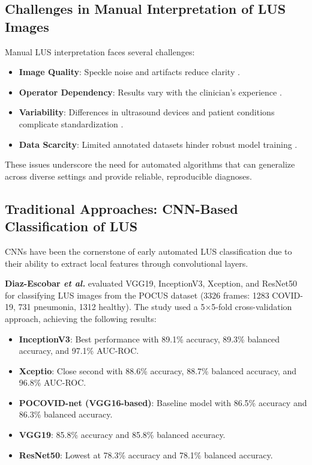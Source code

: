 \documentclass[12pt, a4paper]{article}
\begin{document}
\subsection{Challenges in Manual Interpretation of LUS Images}

Manual LUS interpretation faces several challenges:
\begin{itemize}
\item \textbf{Image Quality}: Speckle noise and artifacts reduce clarity \cite{vafaeezadeh}.
\item \textbf{Operator Dependency}: Results vary with the clinician’s experience \cite{vafaeezadeh}.
\item \textbf{Variability}: Differences in ultrasound devices and patient conditions complicate standardization \cite{diaz}.
\item \textbf{Data Scarcity}: Limited annotated datasets hinder robust model training \cite{vafaeezadeh}.
\end{itemize}
These issues underscore the need for automated algorithms that can generalize across diverse settings and provide reliable, reproducible diagnoses.

\subsection{Traditional Approaches: CNN-Based Classification of LUS}

CNNs have been the cornerstone of early automated LUS classification due to their ability to extract local features through convolutional layers.

\textbf{Diaz-Escobar \textit{et al.}}\cite{diaz}  evaluated VGG19, InceptionV3, Xception, and ResNet50 for classifying LUS images from the POCUS dataset (3326 frames: 1283 COVID-19, 731 pneumonia, 1312 healthy). The study used a 5×5-fold cross-validation approach, achieving the following results:
\begin{itemize}
  \item \textbf{InceptionV3}: Best performance with 89.1\% accuracy, 89.3\% balanced accuracy, and 97.1\% AUC-ROC.
   \item \textbf{Xceptio}: Close second with 88.6\% accuracy, 88.7\% balanced accuracy, and 96.8\% AUC-ROC.
   \item \textbf{POCOVID-net (VGG16-based)}: Baseline model with 86.5\% accuracy and 86.3\% balanced accuracy.
   \item \textbf{VGG19}: 85.8\% accuracy and 85.8\% balanced accuracy.
   \item \textbf{ResNet50}: Lowest at 78.3\% accuracy and 78.1\% balanced accuracy.
\end{itemize}
\end{document}

